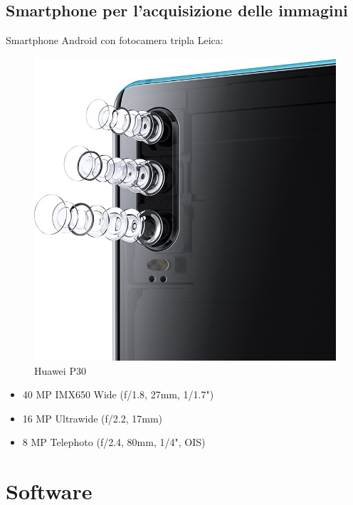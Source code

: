\documentclass[twoside]{supsistudent}
\begin{document}
\subsection{Smartphone per l'acquisizione delle immagini}
Smartphone Android con fotocamera tripla Leica:
\begin{figure}[H]
  \center
  \includegraphics[scale=0.15]{images/smartphone.jpg}
  \caption{Huawei P30}
\end{figure}
\begin{itemize}
  \item 40 MP IMX650 Wide (f/1.8, 27mm, 1/1.7")
  \item 16 MP Ultrawide (f/2.2, 17mm)
  \item 8 MP Telephoto (f/2.4, 80mm, 1/4", OIS)
\end{itemize}
\section{Software}
\end{document}

